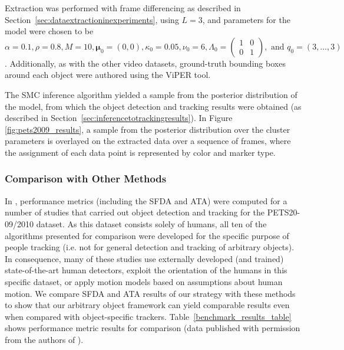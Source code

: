 \documentclass[twocolumn, final]{svjour3}
\begin{document}
Extraction was performed with frame differencing as described in Section~\ref{sec:dataextractioninexperiments}, using $L=3$, and parameters for the model were chosen to be $\alpha = 0.1, \rho = 0.8, M = 10, \boldsymbol{\mu}_{0} = (0,0), \kappa_{0} = 0.05, \nu_{0} = 6, \Lambda_{0} = \left( \begin{smallmatrix} 1&0\\ 0&1 \end{smallmatrix} \right), \text{ and } q_{0} = (3, \ldots, 3)$. Additionally, as with the other video datasets, ground-truth bounding boxes around each object were authored using the ViPER tool.

The SMC inference algorithm yielded a sample from the posterior distribution of the model, from which the object detection and tracking results were obtained (as described in Section~\ref{sec:inferencetotrackingresults}). In Figure \ref{fig:pets2009_results}, a sample from the posterior distribution over the cluster parameters is overlayed on the extracted data over a sequence of frames, where the assignment of each data point is represented by color and marker type.


\subsubsection{Comparison with Other Methods}
\label{sec:comparisonwithothermethods}

In \cite{ellis_2010}, performance metrics (including the SFDA and ATA) were computed for a number of studies that carried out object detection and tracking for the PETS20-\\09/2010 dataset. As this dataset consists solely of humans, all ten of the algorithms presented for comparison were developed for the specific purpose of people tracking (i.e. not for general detection and tracking of arbitrary objects). In consequence, many of these studies use externally developed (and trained) state-of-the-art human detectors, exploit the orientation of the humans in this specific dataset, or apply motion models based on assumptions about human motion. We compare SFDA and ATA results of our strategy with these methods to show that our arbitrary object framework can yield comparable results even when compared with object-specific trackers. Table~\ref{benchmark_results_table} shows performance metric results for comparison (data published with permission from the authors of \cite{ellis_2010}).


\end{document}
